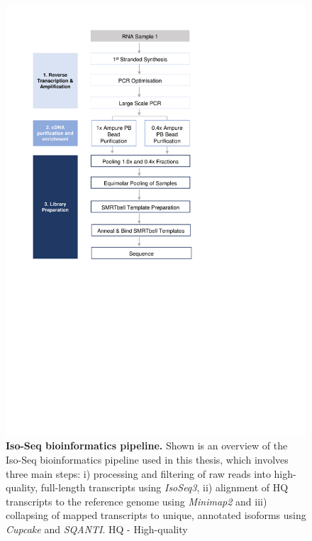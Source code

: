 \begin{figure}[]
	\centering
	\vspace{20pt}
	\includegraphics[page=17,trim={0 6cm 0 0},clip,scale = 0.8]{Figures/ProjectDevelopment_Figures.pdf}
	\captionsetup{width=0.95\textwidth}
	\caption[Iso-Seq bioinformatics pipeline]%
	{\textbf{Iso-Seq bioinformatics pipeline.} Shown is an overview of the Iso-Seq bioinformatics pipeline used in this thesis, which involves three main steps: i) processing and filtering of raw reads into high-quality, full-length transcripts using \textit{IsoSeq3}, ii) alignment of HQ transcripts to the reference genome using \textit{Minimap2} and iii) collapsing of mapped transcripts to unique, annotated isoforms using \textit{Cupcake} and \textit{SQANTI}. HQ - High-quality}
	\label{fig:isoseq_bioinformatics_Pipeline}
\end{figure}

